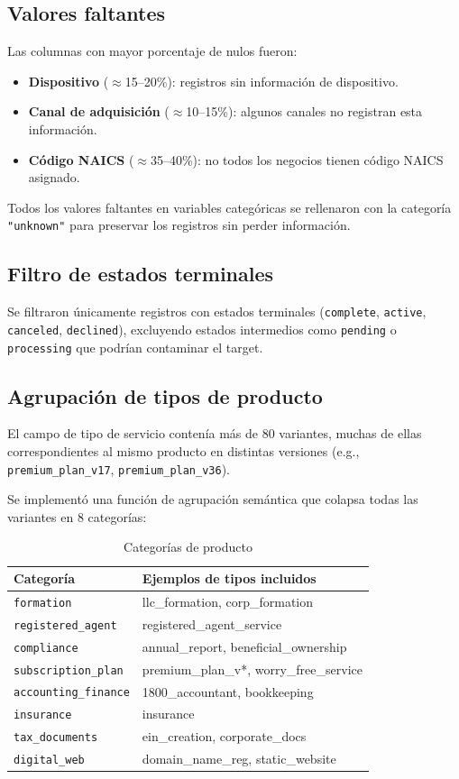 \documentclass[12pt,letterpaper]{article}
\begin{document}
\subsection{Valores faltantes}
Las columnas con mayor porcentaje de nulos fueron:
\begin{itemize}
  \item \textbf{Dispositivo} ($\approx$15–20\%): registros sin información de dispositivo.
  \item \textbf{Canal de adquisición} ($\approx$10–15\%): algunos canales no registran esta información.
  \item \textbf{Código NAICS} ($\approx$35–40\%): no todos los negocios tienen código NAICS asignado.
\end{itemize}
Todos los valores faltantes en variables categóricas se rellenaron con la categoría
\texttt{"unknown"} para preservar los registros sin perder información.

\subsection{Filtro de estados terminales}
Se filtraron únicamente registros con estados terminales
(\texttt{complete}, \texttt{active}, \texttt{canceled}, \texttt{declined}),
excluyendo estados intermedios como \texttt{pending} o \texttt{processing} que
podrían contaminar el target.

\subsection{Agrupación de tipos de producto}
El campo de tipo de servicio contenía más de 80 variantes, muchas de ellas
correspondientes al mismo producto en distintas versiones
(e.g., \texttt{premium\_plan\_v17}, \texttt{premium\_plan\_v36}).

Se implementó una función de agrupación semántica que colapsa todas las variantes
en 8 categorías:

\begin{table}[H]
\centering
\caption{Categorías de producto}
\begin{tabular}{ll}
\toprule
\textbf{Categoría} & \textbf{Ejemplos de tipos incluidos} \\
\midrule
\texttt{formation}          & llc\_formation, corp\_formation \\
\texttt{registered\_agent}  & registered\_agent\_service \\
\texttt{compliance}         & annual\_report, beneficial\_ownership \\
\texttt{subscription\_plan} & premium\_plan\_v*, worry\_free\_service \\
\texttt{accounting\_finance}& 1800\_accountant, bookkeeping \\
\texttt{insurance}          & insurance \\
\texttt{tax\_documents}     & ein\_creation, corporate\_docs \\
\texttt{digital\_web}       & domain\_name\_reg, static\_website \\
\bottomrule
\end{tabular}
\end{table}
\end{document}
